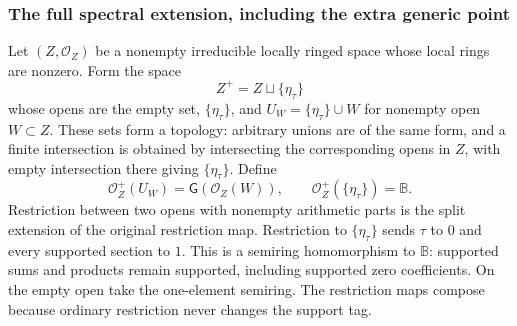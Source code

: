 \documentclass[11pt,a4paper]{article}
\theoremstyle{definition}\newtheorem{definition}[theorem]{Definition}
\newcommand{\G}{\mathsf G}\newcommand{\Tor}{\operatorname{Tor}}\newcommand{\Frac}{\operatorname{Frac}}
\begin{document}
\subsubsection{The full spectral extension, including the extra generic point}

Let $(Z,\mathcal O_Z)$ be a nonempty irreducible locally ringed space
whose local rings are nonzero. Form the space
\[
 Z^+=Z\sqcup\{\eta_\tau\}
 \tag{AV6.4}\label{eq:full-spectrum-space}
\]
whose opens are the empty set, $\{\eta_\tau\}$, and
$U_W=\{\eta_\tau\}\cup W$ for nonempty open $W\subset Z$.
These sets form a topology: arbitrary unions are of the same form,
and a finite intersection is obtained by intersecting the corresponding
opens in $Z$, with empty intersection there giving $\{\eta_\tau\}$.
Define
\[
 \mathcal O_Z^+(U_W)=\G(\mathcal O_Z(W)),\qquad
 \mathcal O_Z^+(\{\eta_\tau\})=\mathbb B.
 \tag{AV6.5}\label{eq:full-spectrum-sheaf}
\]
Restriction between two opens with nonempty arithmetic parts is the
split extension of the original restriction map. Restriction to
$\{\eta_\tau\}$ sends $\tau$ to $0$ and every supported section to $1$.
This is a semiring homomorphism to $\mathbb B$: supported sums and
products remain supported, including supported zero coefficients.
On the empty open take the one-element semiring. The restriction maps
compose because ordinary restriction never changes the support tag.
\end{document}
